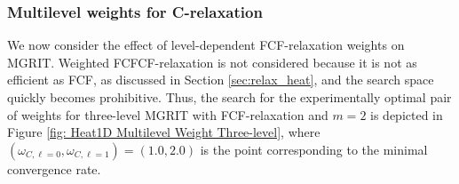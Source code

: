 \documentclass[VANCOUVER,STIX1COL]{WileyNJD-v2}
\begin{document}
\subsubsection{Multilevel weights for C-relaxation}
\label{sec:Multilevel weights for C-relaxation}

We now consider the effect of level-dependent FCF-relaxation weights on MGRIT.  Weighted FCFCF-relaxation is not 
considered because it is not as efficient as FCF, as discussed in Section \ref{sec:relax_heat}, and the search 
space quickly becomes prohibitive.  Thus, the search for the experimentally optimal pair of weights for 
three-level MGRIT with FCF-relaxation and $m=2$ is depicted in Figure 
\ref{fig: Heat1D Multilevel Weight Three-level}, where $(\omega_{C,\ell=0}, \omega_{C,\ell=1})=(1.0, 2.0)$ 
is the point corresponding to the minimal convergence rate.
\end{document}
